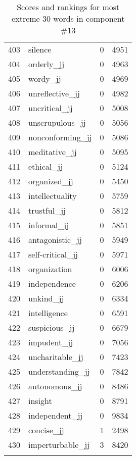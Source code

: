 \begin{longtable}[!htbp]{| rlr@{.}l |}
    403 & silence & 0 & 4951 \\
    404 & orderly\_jj & 0 & 4963 \\
    405 & wordy\_jj & 0 & 4969 \\
    406 & unreflective\_jj & 0 & 4982 \\
    407 & uncritical\_jj & 0 & 5008 \\
    408 & unscrupulous\_jj & 0 & 5056 \\
    409 & nonconforming\_jj & 0 & 5086 \\
    410 & meditative\_jj & 0 & 5095 \\
    411 & ethical\_jj & 0 & 5124 \\
    412 & organized\_jj & 0 & 5450 \\
    413 & intellectuality & 0 & 5759 \\
    414 & trustful\_jj & 0 & 5812 \\
    415 & informal\_jj & 0 & 5851 \\
    416 & antagonistic\_jj & 0 & 5949 \\
    417 & self-critical\_jj & 0 & 5971 \\
    418 & organization & 0 & 6006 \\
    419 & independence & 0 & 6206 \\
    420 & unkind\_jj & 0 & 6334 \\
    421 & intelligence & 0 & 6591 \\
    422 & suspicious\_jj & 0 & 6679 \\
    423 & impudent\_jj & 0 & 7056 \\
    424 & uncharitable\_jj & 0 & 7423 \\
    425 & understanding\_jj & 0 & 7842 \\
    426 & autonomous\_jj & 0 & 8486 \\
    427 & insight & 0 & 8791 \\
    428 & independent\_jj & 0 & 9834 \\
    429 & concise\_jj & 1 & 2498 \\
    430 & imperturbable\_jj & 3 & 8420 \\
    \hline
    \caption{Scores and rankings for most extreme 30 words in component \#13} \\
\end{longtable}
